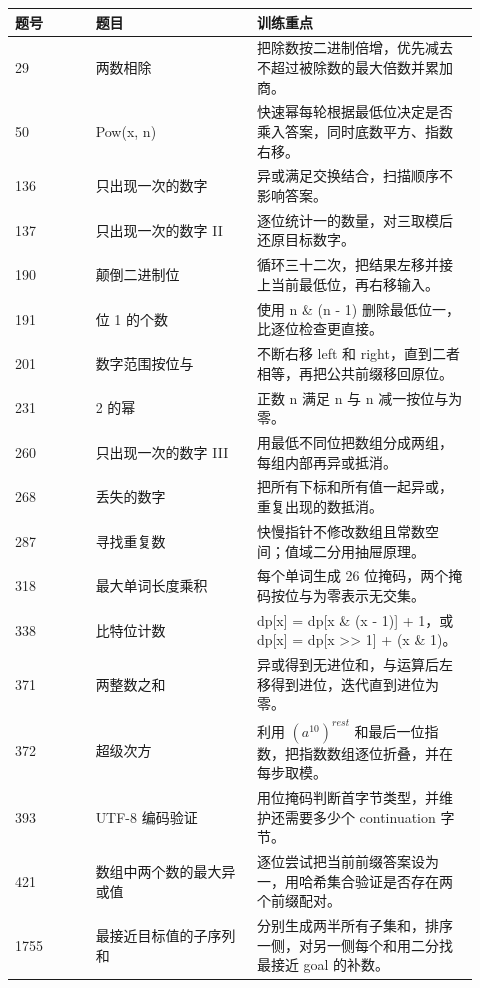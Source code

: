 \begin{longtable}{@{}p{0.16\linewidth}p{0.32\linewidth}p{0.44\linewidth}@{}}
\toprule
题号 & 题目 & 训练重点\\
\midrule
\endhead
29 & 两数相除 & 把除数按二进制倍增，优先减去不超过被除数的最大倍数并累加商。\\
50 & Pow(x, n) & 快速幂每轮根据最低位决定是否乘入答案，同时底数平方、指数右移。\\
136 & 只出现一次的数字 & 异或满足交换结合，扫描顺序不影响答案。\\
137 & 只出现一次的数字 II & 逐位统计一的数量，对三取模后还原目标数字。\\
190 & 颠倒二进制位 & 循环三十二次，把结果左移并接上当前最低位，再右移输入。\\
191 & 位 1 的个数 & 使用 n \& (n - 1) 删除最低位一，比逐位检查更直接。\\
201 & 数字范围按位与 & 不断右移 left 和 right，直到二者相等，再把公共前缀移回原位。\\
231 & 2 的幂 & 正数 n 满足 n 与 n 减一按位与为零。\\
260 & 只出现一次的数字 III & 用最低不同位把数组分成两组，每组内部再异或抵消。\\
268 & 丢失的数字 & 把所有下标和所有值一起异或，重复出现的数抵消。\\
287 & 寻找重复数 & 快慢指针不修改数组且常数空间；值域二分用抽屉原理。\\
318 & 最大单词长度乘积 & 每个单词生成 26 位掩码，两个掩码按位与为零表示无交集。\\
338 & 比特位计数 & dp[x] = dp[x \& (x - 1)] + 1，或 dp[x] = dp[x >> 1] + (x \& 1)。\\
371 & 两整数之和 & 异或得到无进位和，与运算后左移得到进位，迭代直到进位为零。\\
372 & 超级次方 & 利用 \ensuremath{(a^10)^{rest}} 和最后一位指数，把指数数组逐位折叠，并在每步取模。\\
393 & UTF-8 编码验证 & 用位掩码判断首字节类型，并维护还需要多少个 continuation 字节。\\
421 & 数组中两个数的最大异或值 & 逐位尝试把当前前缀答案设为一，用哈希集合验证是否存在两个前缀配对。\\
1755 & 最接近目标值的子序列和 & 分别生成两半所有子集和，排序一侧，对另一侧每个和用二分找最接近 goal 的补数。\\
\bottomrule
\end{longtable}

